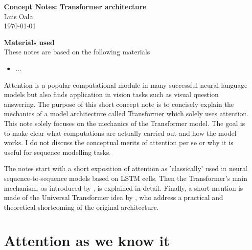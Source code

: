 \documentclass[11pt]{article}
\theoremstyle{definition}
\begin{document}
\thispagestyle{empty}

\begin{center}
{\LARGE \bf Concept Notes: Transformer architecture}\\
{\large Luis Oala}\\
\today
\end{center}

\begin{center}
	{\Large \bf Materials used}
	\\
	These notes are based on the following materials
\end{center}
\begin{itemize}
	\item ...
\end{itemize}

Attention is a popular computational module in many successful neural language models but also finds application in vision tasks such as visual question answering. The purpose of this short concept note is to concisely explain the mechanics of a model architecture called Transformer which solely uses attention. This note solely focuses on the mechanics of the Transformer model. The goal is to make clear what computations are actually carried out and how the model works. I do not discuss the conceptual merits of attention per se or why it is useful for sequence modelling tasks.
\par The notes start with a short exposition of attention as 'classically' used in neural sequence-to-sequence models based on LSTM cells. Then the Transformer's main mechanism, as introduced by \cite{vaswani_attention_2017}, is explained in detail. Finally, a short mention is made of the Universal Transformer idea by \cite{dehghani_universal_2018}, who address a practical and theoretical shortcoming of the original architecture.
\section{Attention as we know it}
\end{document}
